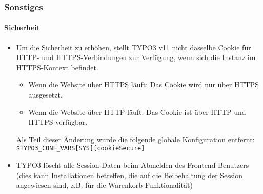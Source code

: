%

\begin{frame}[fragile]
	\frametitle{Sonstiges}
	\framesubtitle{Sicherheit}

	\begin{itemize}
		\item Um die Sicherheit zu erhöhen, stellt TYPO3 v11 nicht dasselbe Cookie für
			HTTP- und HTTPS-Verbindungen zur Verfügung, wenn sich die Instanz im HTTPS-Kontext befindet.

			\begin{itemize}
				\item Wenn die Website über HTTPS läuft: Das Cookie wird nur über HTTPS ausgesetzt.
				\item Wenn die Website über HTTP läuft: Das Cookie ist über HTTP und HTTPS verfügbar.
			\end{itemize}

			Als Teil dieser Änderung wurde die folgende globale Konfiguration entfernt:
		 	\smaller\texttt{\$TYPO3\_CONF\_VARS[SYS][cookieSecure]}\normalsize

		\item TYPO3 löscht alle Session-Daten beim Abmelden des Frontend-Benutzers\newline
			\small(dies kann Installationen betreffen, die auf die Beibehaltung der Session angewiesen sind, z.B. für die Warenkorb-Funktionalität)\normalsize

	\end{itemize}

\end{frame}

